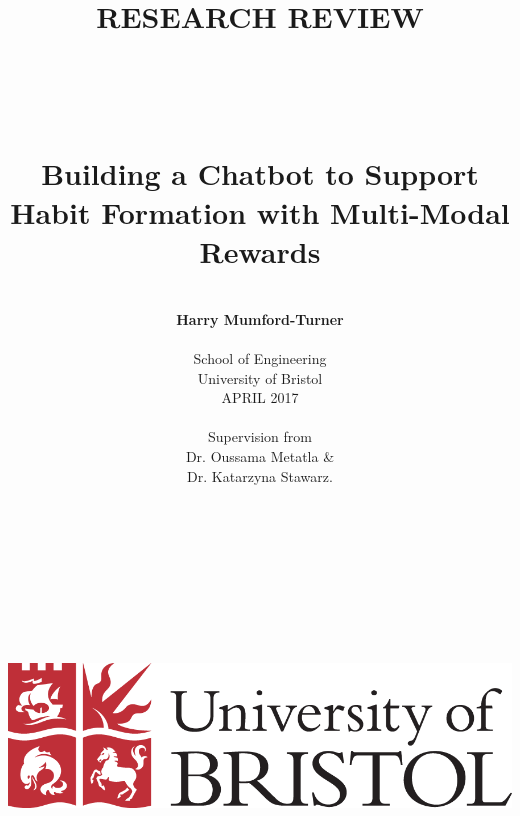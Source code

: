 \date{} %
\title{\large{RESEARCH REVIEW}
\\
\huge{\textbf{\\\\\\Building a Chatbot to Support Habit Formation with Multi-Modal Rewards}}}
\author{\\
\textbf{Harry Mumford-Turner}\\
\\
School of Engineering\\
University of Bristol\\
APRIL 2017\\
\\
Supervision from\\
Dr. Oussama Metatla \&\\Dr. Katarzyna Stawarz.
\\
\\\\
\\
\\
\\
\\
\\
\\
\\
\includegraphics[scale=0.29]{resources/UoB-logo.png}}
